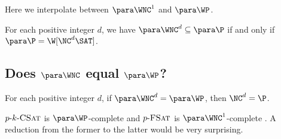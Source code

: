 Here we interpolate between $\para \WNC^1$ and $\para \WP$.

\begin{conjecture}
  For each positive integer $d$, we have $\para \WNC^d \subseteq \para \P$ if and only if $\para \P = \W[\NC^d \SAT]$.
\end{conjecture}

\subsection{Does \texorpdfstring{$\para \WNC$}{paraWNC} equal \texorpdfstring{$\para \WP$}{paraWP}?}
\label{sec:wncwp}

\begin{conjecture}
  For each positive integer $d$, if $\para \WNC^d = \para \WP$, then $\NC^d = \P$.
\end{conjecture}
\begin{justification}
  $p \textnormal{-} k \textnormal{-} \textsc{CSat}$ is $\para \WP$-complete and $p \textnormal{-} \textsc{FSat}$ is $\para \WNC^1$-complete \autocite[Theorem~3.6]{est15}.
  A reduction from the former to the latter would be very surprising.
\end{justification}

